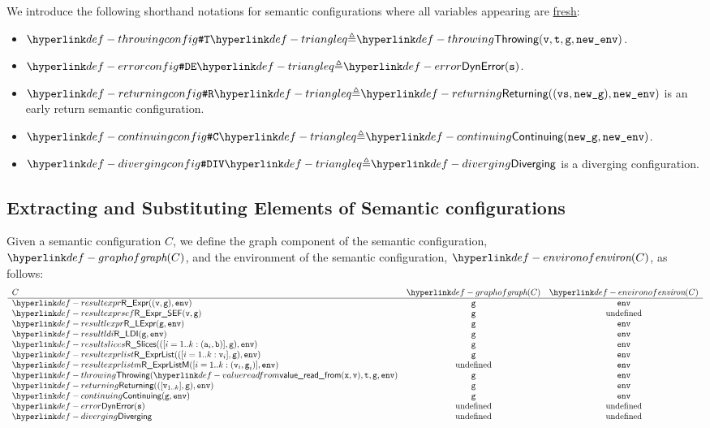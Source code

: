 We introduce the following shorthand notations for semantic configurations where all variables
appearing are \hyperlink{def-freshvariables}{fresh}:
\begin{itemize}
\hypertarget{def-throwingconfig}{}
\item $\ThrowingConfig \triangleq \Throwing(\vv, \vt, \vg, \newenv)$.
      \hypertarget{def-errorconfig}{}
\item $\DynErrorConfig \triangleq \DynamicError(\vs)$.
      \hypertarget{def-returningconfig}{}
\item $\ReturningConfig \triangleq \Returning((\vvs,\newg), \newenv)$
      is an early return semantic configuration.
\hypertarget{def-continuingconfig}{}
\item $\ContinuingConfig \triangleq \Continuing(\newg, \newenv)$.
      \hypertarget{def-divergingconfig}{}
\item $\DivergingConfig \triangleq \Diverging$ is a diverging configuration.
\end{itemize}

\subsection{Extracting and Substituting Elements of Semantic configurations}

\hypertarget{def-graphof}{}
\hypertarget{def-environof}{}
Given a semantic configuration $C$, we define the graph component of the semantic configuration, \\
$\graphof{C}$, and the environment of the semantic configuration, $\environof{C}$, as follows:
\[
\begin{array}{lcc}
  C & \graphof{C} & \environof{C}\\
  \hline
  \ResultExpr((\vv, \vg), \env) & \vg & \env\\
  \ResultExprSEF(\vv, \vg) & \vg & \text{undefined}\\
  \ResultLexpr(\vg, \env) & \vg & \env \\
  \ResultLDI(\vg, \env) & \vg & \env \\
  \ResultSlices(([i=1..k: (\va_i,\vb)], \vg), \env) & \vg & \env \\
  \ResultExprList(([i=1..k: \vv_i], \vg), \env) & \vg & \env \\
  \ResultExprListM([i=1..k: (\vv_i,\vg_i)], \env) & \text{undefined} & \env\\
  \Throwing(\valuereadfrom(\vx,\vv),\vt,\vg, \env) & \vg & \env\\
  \Returning(([\vv_{1..k}],\vg), \env) & \vg & \env\\
  \Continuing(\vg, \env) & \vg & \env\\
  \DynamicError(\vs) & \text{undefined} & \text{undefined}\\
  \Diverging & \text{undefined} & \text{undefined}\\
\end{array}
\]

